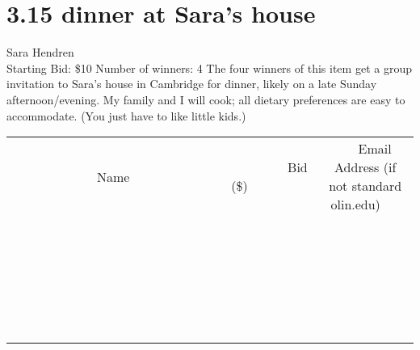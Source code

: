 \documentclass[11pt]{article}
\begin{document}
\section*{3.15 dinner at Sara's house}
Sara Hendren
\\
Starting Bid: \$10
\newline
Number of winners: 4
\newline
The four winners of this item get a group invitation to Sara's house in Cambridge for dinner, likely on a late Sunday afternoon/evening. My family and I will cook; all dietary preferences are easy to accommodate. (You just have to like little kids.)
\\[6ex]
\begin{tabular}{c c c}
~~~~~~~~~~~~~Name~~~~~~~~~~~~~ & ~~~~~~~~~Bid (\$)~~~~~~~~~  & ~~~Email Address (if not standard olin.edu)~~~\\
 & & \\
\hline
 & & \\
\hline
 & & \\
\hline
 & & \\
\hline
 & & \\
\hline
 & & \\
\hline
 & & \\
\hline
 & & \\
\hline
 & & \\
\hline
 & & \\
\hline
 & & \\
\hline
 & & \\
\hline
 & & \\
\hline
 & & \\
\hline
 & & \\
\hline
 & & \\
\hline
 & & \\
\hline
 & & \\
\hline
 & & \\
\hline
 & & \\
\hline
 & & \\
\hline
 & & \\
\hline
 & & \\
\hline
 & & \\
\hline
 & & \\
\hline
 & & \\
\hline
\end{tabular}
\newpage
\end{document}
